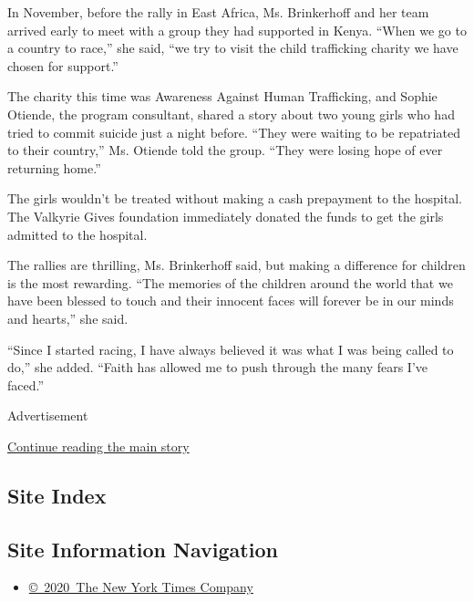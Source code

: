 In November, before the rally in East Africa, Ms. Brinkerhoff and her
team arrived early to meet with a group they had supported in Kenya.
``When we go to a country to race,'' she said, ``we try to visit the
child trafficking charity we have chosen for support.''

The charity this time was Awareness Against Human Trafficking, and
Sophie Otiende, the program consultant, shared a story about two young
girls who had tried to commit suicide just a night before. ``They were
waiting to be repatriated to their country,'' Ms. Otiende told the
group. ``They were losing hope of ever returning home.''

The girls wouldn't be treated without making a cash prepayment to the
hospital. The Valkyrie Gives foundation immediately donated the funds to
get the girls admitted to the hospital.

The rallies are thrilling, Ms. Brinkerhoff said, but making a difference
for children is the most rewarding. ``The memories of the children
around the world that we have been blessed to touch and their innocent
faces will forever be in our minds and hearts,'' she said.

``Since I started racing, I have always believed it was what I was being
called to do,'' she added. ``Faith has allowed me to push through the
many fears I've faced.''

Advertisement

\protect\hyperlink{after-bottom}{Continue reading the main story}

\hypertarget{site-index}{%
\subsection{Site Index}\label{site-index}}

\hypertarget{site-information-navigation}{%
\subsection{Site Information
Navigation}\label{site-information-navigation}}

\begin{itemize}
\tightlist
\item
  \href{https://help.nytimes3xbfgragh.onion/hc/en-us/articles/115014792127-Copyright-notice}{©~2020~The
  New York Times Company}
\end{itemize}


